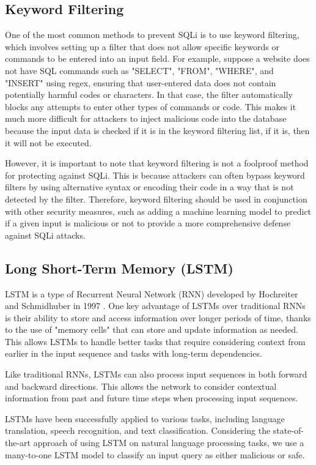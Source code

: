\subsection{Keyword Filtering}
\label{subsec:keyword-filtering}
\par One of the most common methods to prevent SQLi is to use keyword filtering, which involves setting up a filter that does not allow specific keywords or commands to be entered into an input field. For example, suppose a website does not have SQL commands such as "SELECT", "FROM", "WHERE", and "INSERT" using regex, ensuring that user-entered data does not contain potentially harmful codes or characters. In that case, the filter automatically blocks any attempts to enter other types of commands or code. This makes it much more difficult for attackers to inject malicious code into the database because the input data is checked if it is in the keyword filtering list, if it is, then it will not be executed.
\par However, it is important to note that keyword filtering is not a foolproof method for protecting against SQLi. This is because attackers can often bypass keyword filters by using alternative syntax or encoding their code in a way that is not detected by the filter. Therefore, keyword filtering should be used in conjunction with other security measures, such as adding a machine learning model to predict if a given input is malicious or not to provide a more comprehensive defense against SQLi attacks.

\subsection{Long Short-Term Memory (LSTM)}
\label{subsec:LSTM}
\par LSTM is a type of Recurrent Neural Network (RNN) developed by Hochreiter and Schmidhuber in 1997 \cite{10.1162/neco.1997.9.8.1735}. One key advantage of LSTMs over traditional RNNs is their ability to store and access information over longer periods of time, thanks to the use of "memory cells" that can store and update information as needed. This allows LSTMs to handle better tasks that require considering context from earlier in the input sequence and tasks with long-term dependencies.
\par Like traditional RNNs, LSTMs can also process input sequences in both forward and backward directions. This allows the network to consider contextual information from past and future time steps when processing input sequences.
\par LSTMs have been successfully applied to various tasks, including language translation, speech recognition, and text classification. Considering the state-of-the-art approach of using LSTM on natural language processing tasks, we use a many-to-one LSTM model to classify an input query as either malicious or safe.
